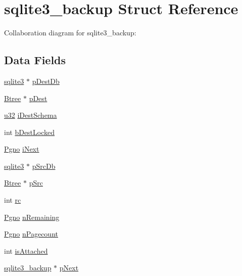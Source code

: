 \hypertarget{structsqlite3__backup}{}\section{sqlite3\+\_\+backup Struct Reference}
\label{structsqlite3__backup}


Collaboration diagram for sqlite3\+\_\+backup\+:
\subsection*{Data Fields}
\begin{DoxyCompactItemize}
\item 
\hyperlink{structsqlite3}{sqlite3} $\ast$ \hyperlink{structsqlite3__backup_a4fe8f1d9456d5a379a3b1f6ffd50fbe0}{p\+Dest\+Db}
\item 
\hyperlink{struct_btree}{Btree} $\ast$ \hyperlink{structsqlite3__backup_a845b397227de5c11118fa9db6b80ebde}{p\+Dest}
\item 
\hyperlink{sqlite3_8c_a03ad5adfaeb9b7640dde78a0cc390319}{u32} \hyperlink{structsqlite3__backup_aefa4865e79a3a7868ca8177fa42130b1}{i\+Dest\+Schema}
\item 
int \hyperlink{structsqlite3__backup_a6eb18cf037082296899340a3b2200425}{b\+Dest\+Locked}
\item 
\hyperlink{sqlite3_8c_aec0c653e8dd16e4639caf2f8ea54f55c}{Pgno} \hyperlink{structsqlite3__backup_a1f54c0b52e2d890531dd9d7c9b8961b0}{i\+Next}
\item 
\hyperlink{structsqlite3}{sqlite3} $\ast$ \hyperlink{structsqlite3__backup_a6ad9342dfbfe7f65e4f4c9c74b4d082b}{p\+Src\+Db}
\item 
\hyperlink{struct_btree}{Btree} $\ast$ \hyperlink{structsqlite3__backup_aee09321030964a76af7f5e63ea20cb9c}{p\+Src}
\item 
int \hyperlink{structsqlite3__backup_ac6509c6fe4cbf7bde170597172f8a288}{rc}
\item 
\hyperlink{sqlite3_8c_aec0c653e8dd16e4639caf2f8ea54f55c}{Pgno} \hyperlink{structsqlite3__backup_af36e03f9d5806ab7fa1530a3950cc014}{n\+Remaining}
\item 
\hyperlink{sqlite3_8c_aec0c653e8dd16e4639caf2f8ea54f55c}{Pgno} \hyperlink{structsqlite3__backup_a40c352fa743b4e8ae8ca29ab5c947f5c}{n\+Pagecount}
\item 
int \hyperlink{structsqlite3__backup_a46ccfc2d96bd0831d4610c6da0738ecc}{is\+Attached}
\item 
\hyperlink{structsqlite3__backup}{sqlite3\+\_\+backup} $\ast$ \hyperlink{structsqlite3__backup_a76f1349753f0e489a86cacd7afe3aa3a}{p\+Next}
\end{DoxyCompactItemize}



